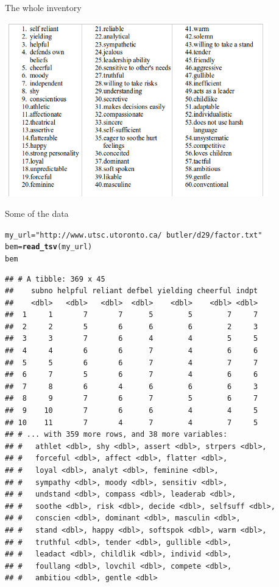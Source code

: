 \documentclass[unknownkeysallowed]{beamer}\usepackage[]{graphicx}\usepackage[]{color}
\makeatletter
\newcommand{\hlstr}[1]{\textcolor[rgb]{0.192,0.494,0.8}{#1}}%
\newcommand{\hlstd}[1]{\textcolor[rgb]{0.345,0.345,0.345}{#1}}%
\newcommand{\hlkwb}[1]{\textcolor[rgb]{0.69,0.353,0.396}{#1}}%
\newcommand{\hlkwd}[1]{\textcolor[rgb]{0.737,0.353,0.396}{\textbf{#1}}}%
\newenvironment{kframe}{%
 \def\at@end@of@kframe{}%
 \ifinner\ifhmode%
  \def\at@end@of@kframe{\end{minipage}}%
  \begin{minipage}{\columnwidth}%
 \fi\fi%
 \def\FrameCommand##1{\hskip\@totalleftmargin \hskip-\fboxsep
 \colorbox{shadecolor}{##1}\hskip-\fboxsep
     \hskip-\linewidth \hskip-\@totalleftmargin \hskip\columnwidth}%
 \MakeFramed {\advance\hsize-\width
   \@totalleftmargin\z@ \linewidth\hsize
   \@setminipage}}%
 {\par\unskip\endMakeFramed%
 \at@end@of@kframe}
\newenvironment{knitrout}{}{} %
\makeatother
\begin{document}
\begin{frame}[fragile]{The whole inventory}

\includegraphics[width=4.5in]{bem}

\end{frame}

\begin{frame}[fragile]{Some of the data}

\begin{knitrout}\scriptsize
{}\color{fgcolor}\begin{kframe}
\begin{alltt}
\hlstd{my_url}\hlkwb{=}\hlstr{"http://www.utsc.utoronto.ca/~butler/d29/factor.txt"}
\hlstd{bem}\hlkwb{=}\hlkwd{read_tsv}\hlstd{(my_url)}
\hlstd{bem}
\end{alltt}
\begin{verbatim}
## # A tibble: 369 x 45
##    subno helpful reliant defbel yielding cheerful indpt
##    <dbl>   <dbl>   <dbl>  <dbl>    <dbl>    <dbl> <dbl>
##  1     1       7       7      5        5        7     7
##  2     2       5       6      6        6        2     3
##  3     3       7       6      4        4        5     5
##  4     4       6       6      7        4        6     6
##  5     5       6       6      7        4        7     7
##  6     7       5       6      7        4        6     6
##  7     8       6       4      6        6        6     3
##  8     9       7       6      7        5        6     7
##  9    10       7       6      6        4        4     5
## 10    11       7       4      7        4        7     5
## # ... with 359 more rows, and 38 more variables:
## #   athlet <dbl>, shy <dbl>, assert <dbl>, strpers <dbl>,
## #   forceful <dbl>, affect <dbl>, flatter <dbl>,
## #   loyal <dbl>, analyt <dbl>, feminine <dbl>,
## #   sympathy <dbl>, moody <dbl>, sensitiv <dbl>,
## #   undstand <dbl>, compass <dbl>, leaderab <dbl>,
## #   soothe <dbl>, risk <dbl>, decide <dbl>, selfsuff <dbl>,
## #   conscien <dbl>, dominant <dbl>, masculin <dbl>,
## #   stand <dbl>, happy <dbl>, softspok <dbl>, warm <dbl>,
## #   truthful <dbl>, tender <dbl>, gullible <dbl>,
## #   leadact <dbl>, childlik <dbl>, individ <dbl>,
## #   foullang <dbl>, lovchil <dbl>, compete <dbl>,
## #   ambitiou <dbl>, gentle <dbl>
\end{verbatim}
\end{kframe}
\end{knitrout}


\end{frame}
\end{document}
